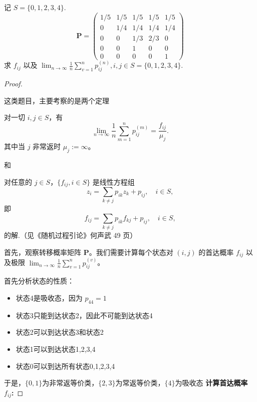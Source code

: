 \documentclass[lang=cn,10pt,thmcnt=section]{elegantbook}
\begin{document}
\begin{example}
	记 $S = \{0, 1, 2, 3, 4\}$.
    \[
    \mathbf{P} = \begin{pmatrix}
    1/5 & 1/5 & 1/5 & 1/5 & 1/5 \\
    0 & 1/4 & 1/4 & 1/4 & 1/4 \\
    0 & 0 & 1/3 & 2/3 & 0 \\
    0 & 0 & 1 & 0 & 0 \\
    0 & 0 & 0 & 0 & 1
    \end{pmatrix}
    \]
    求 $f_{ij}$ 以及 $\lim_{n \to \infty} \frac{1}{n} \sum_{v=1}^{n} p_{ij}^{(n)}, i, j \in S = \{0, 1, 2, 3, 4\}$.
\end{example}
\begin{proof}

\begin{remark}
	这类题目，主要考察的是两个定理

	\begin{theorem}
		对一切 $i, j \in S$，有
	\[
	\lim_{n \to \infty} \frac{1}{n} \sum_{m=1}^{n} p_{ij}^{(m)} = \frac{f_{ij}}{\mu_j}.
	\]
	其中当 $j$ 非常返时 $\mu_j := \infty$。
	
	\end{theorem}
	和\begin{theorem}
		对任意的 $j \in S$，$\{f_{ij}, i \in S\}$ 是线性方程组
	\[
	z_i = \sum_{k \neq j} p_{ik} z_k + p_{ij}, \quad i \in S,
	\]
	即
	\[
	f_{ij} = \sum_{k \neq j} p_{ik} f_{kj} + p_{ij}, \quad i \in S,
	\]
	的解.（见《随机过程引论》何声武 49 页）
	
	\end{theorem}
\end{remark}

	首先，观察转移概率矩阵 $\mathbf{P}$。我们需要计算每个状态对 $(i,j)$ 的首达概率 $f_{ij}$ 以及极限 $\lim_{n \to \infty} \frac{1}{n} \sum_{v=1}^{n} p_{ij}^{(v)}$。

首先分析状态的性质：
\begin{itemize}
    \item 状态4是吸收态，因为 $p_{44} = 1$
    \item 状态3只能到达状态2，因此不可能到达状态4
    \item 状态2可以到达状态3和状态2
    \item 状态1可以到达状态1,2,3,4
    \item 状态0可以到达所有状态0,1,2,3,4
\end{itemize}


于是，$\{0,1\}$为非常返等价类，$\{2,3\}$为常返等价类，$\{4\}$为吸收态
\textbf{计算首达概率 $f_{ij}$:}


\end{proof}
\end{document}

